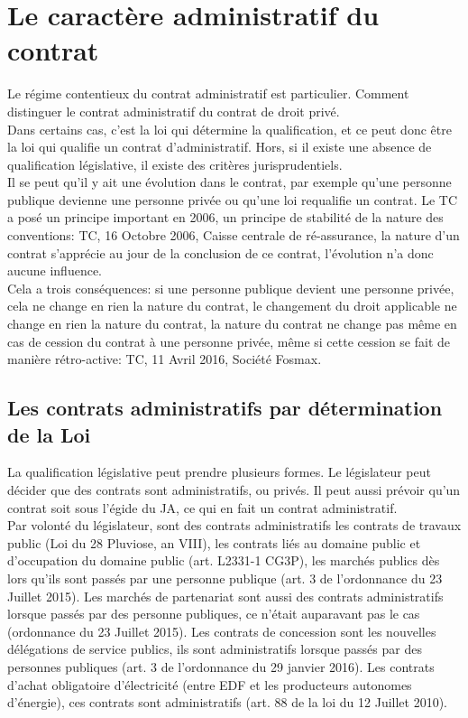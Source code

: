 \documentclass[10pt, a4paper, openany]{book}
\begin{document}
\section{Le caractère administratif du contrat}

Le régime contentieux du contrat administratif est particulier. Comment distinguer le contrat administratif du contrat de droit privé. \\
Dans certains cas, c'est la loi qui détermine la qualification, et ce peut donc être la loi qui qualifie un contrat d'administratif. Hors, si il existe une absence de qualification législative, il existe des critères jurisprudentiels. \\
Il se peut qu'il y ait une évolution dans le contrat, par exemple qu'une personne publique devienne une personne privée ou qu'une loi requalifie un contrat. Le TC a posé un principe important en 2006, un principe de stabilité de la nature des conventions: TC, 16 Octobre 2006, Caisse centrale de ré-assurance, la nature d'un contrat s'apprécie au jour de la conclusion de ce contrat, l'évolution n'a donc aucune influence. \\
Cela a trois conséquences: si une personne publique devient une personne privée, cela ne change en rien la nature du contrat, le changement du droit applicable ne change en rien la nature du contrat, la nature du contrat ne change pas même en cas de cession du contrat à une personne privée, même si cette cession se fait de manière rétro-active: TC, 11 Avril 2016, Société Fosmax. 

\subsection{Les contrats administratifs par détermination de la Loi}

La qualification législative peut prendre plusieurs formes. Le législateur peut décider que des contrats sont administratifs, ou privés. Il peut aussi prévoir qu'un contrat soit sous l'égide du JA, ce qui en fait un contrat administratif. \\
Par volonté du législateur, sont des contrats administratifs les contrats de travaux public (Loi du 28 Pluviose, an VIII), les contrats liés au domaine public et d'occupation du domaine public (art. L2331-1 CG3P), les marchés publics dès lors qu'ils sont passés par une personne publique (art. 3 de l'ordonnance du 23 Juillet 2015). Les marchés de partenariat sont aussi des contrats administratifs lorsque passés par des personne publiques, ce n'était auparavant pas le cas (ordonnance du 23 Juillet 2015). Les contrats de concession sont les nouvelles délégations de service publics, ils sont administratifs lorsque passés par des personnes publiques (art. 3 de l'ordonnance du 29 janvier 2016). Les contrats d'achat obligatoire d'électricité (entre EDF et les producteurs autonomes d'énergie), ces contrats sont administratifs (art. 88 de la loi du 12 Juillet 2010). 
\end{document}

